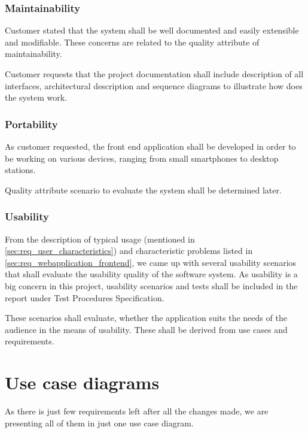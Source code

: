 \documentclass[11pt]{book}
\begin{document}
\subsubsection{Maintainability}
Customer stated that the system shall be well documented and easily extensible and modifiable. These concerns are related to the quality attribute of maintainability.

Customer requests that the project documentation shall include description of all interfaces, architectural description and sequence diagrams to illustrate how does the system work.

\subsubsection{Portability}
As customer requested, the front end application shall be developed in order to be working on various devices, ranging from small smartphones to desktop stations.

Quality attribute scenario to evaluate the system shall be determined later. %

\subsubsection{Usability}\label{sec:req_usability}
From the description of typical usage (mentioned in \ref{sec:req_user_characteristics}) and characteristic problems listed in \ref{sec:req_webapplication_frontend}, we came up with several usability scenarios that shall evaluate the usability quality of the software system. As usability is a big concern in this project, usability scenarios and tests shall be included in the report under Test Procedures Specification.  %

These scenarios shall evaluate, whether the application suits the needs of the audience in the means of usability. These shall be derived from use cases and requirements.

\section{Use case diagrams}
As there is just few requirements left after all the changes made, we are presenting all of them in just one use case diagram.
\end{document}
